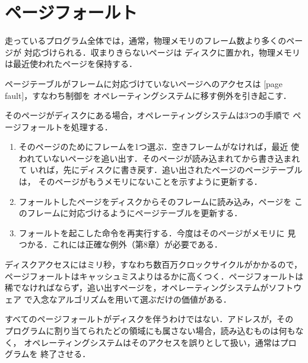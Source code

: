 \documentclass[../main.tex]{subfiles}
\begin{document}
\section{ページフォールト}
\label{sec:l13-page-faults}

走っているプログラム全体では，通常，物理メモリのフレーム数より多くのページが
対応づけられる．収まりきらないページは
ディスクに置かれ，物理メモリは最近使われたページを保持する．

\begin{definition}[ページフォールト]
  ページテーブルがフレームに対応づけていないページへのアクセスは
  [page fault]，すなわち制御を
  オペレーティングシステムに移す例外を引き起こす．
\end{definition}

そのページがディスクにある場合，オペレーティングシステムは3つの手順で
ページフォールトを処理する．
\begin{enumerate}
  \item そのページのためにフレームを1つ選ぶ．空きフレームがなければ，最近
    使われていないページを追い出す．そのページが読み込まれてから書き込まれて
    いれば，先にディスクに書き戻す．追い出されたページのページテーブルは，
    そのページがもうメモリにないことを示すように更新する．
  \item フォールトしたページをディスクからそのフレームに読み込み，ページを
    このフレームに対応づけるようにページテーブルを更新する．
  \item フォールトを起こした命令を再実行する．今度はそのページがメモリに
    見つかる．これには正確な例外（第8章）が必要である．
\end{enumerate}

ディスクアクセスにはミリ秒，すなわち数百万クロックサイクルがかかるので，
ページフォールトはキャッシュミスよりはるかに高くつく．ページフォールトは
稀でなければならず，追い出すページを，オペレーティングシステムがソフトウェア
で入念なアルゴリズムを用いて選ぶだけの価値がある．

すべてのページフォールトがディスクを伴うわけではない．アドレスが，その
プログラムに割り当てられたどの領域にも属さない場合，読み込むものは何もなく，
オペレーティングシステムはそのアクセスを誤りとして扱い，通常はプログラムを
終了させる．
\end{document}
